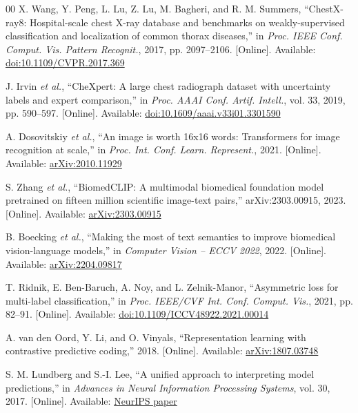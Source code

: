 \documentclass[conference]{IEEEtran}
\begin{document}
\begin{thebibliography}{00}
X. Wang, Y. Peng, L. Lu, Z. Lu, M. Bagheri, and R. M. Summers, ``ChestX-ray8: Hospital-scale chest X-ray database and benchmarks on weakly-supervised classification and localization of common thorax diseases,'' in \emph{Proc. IEEE Conf. Comput. Vis. Pattern Recognit.}, 2017, pp. 2097--2106. [Online]. Available: \href{https://doi.org/10.1109/CVPR.2017.369}{doi:10.1109/CVPR.2017.369}

J. Irvin \emph{et al.}, ``CheXpert: A large chest radiograph dataset with uncertainty labels and expert comparison,'' in \emph{Proc. AAAI Conf. Artif. Intell.}, vol. 33, 2019, pp. 590--597. [Online]. Available: \href{https://doi.org/10.1609/aaai.v33i01.3301590}{doi:10.1609/aaai.v33i01.3301590}

A. Dosovitskiy \emph{et al.}, ``An image is worth 16x16 words: Transformers for image recognition at scale,'' in \emph{Proc. Int. Conf. Learn. Represent.}, 2021. [Online]. Available: \href{https://arxiv.org/abs/2010.11929}{arXiv:2010.11929}

S. Zhang \emph{et al.}, ``BiomedCLIP: A multimodal biomedical foundation model pretrained on fifteen million scientific image-text pairs,'' arXiv:2303.00915, 2023. [Online]. Available: \href{https://arxiv.org/abs/2303.00915}{arXiv:2303.00915}

B. Boecking \emph{et al.}, ``Making the most of text semantics to improve biomedical vision-language models,'' in \emph{Computer Vision -- ECCV 2022}, 2022. [Online]. Available: \href{https://arxiv.org/abs/2204.09817}{arXiv:2204.09817}

T. Ridnik, E. Ben-Baruch, A. Noy, and L. Zelnik-Manor, ``Asymmetric loss for multi-label classification,'' in \emph{Proc. IEEE/CVF Int. Conf. Comput. Vis.}, 2021, pp. 82--91. [Online]. Available: \href{https://doi.org/10.1109/ICCV48922.2021.00014}{doi:10.1109/ICCV48922.2021.00014}

A. van den Oord, Y. Li, and O. Vinyals, ``Representation learning with contrastive predictive coding,'' 2018. [Online]. Available: \href{https://arxiv.org/abs/1807.03748}{arXiv:1807.03748}

S. M. Lundberg and S.-I. Lee, ``A unified approach to interpreting model predictions,'' in \emph{Advances in Neural Information Processing Systems}, vol. 30, 2017. [Online]. Available: \href{https://papers.nips.cc/paper/7062-a-unified-approach-to-interpreting-model-predictions}{NeurIPS paper}


\end{thebibliography}
\end{document}
